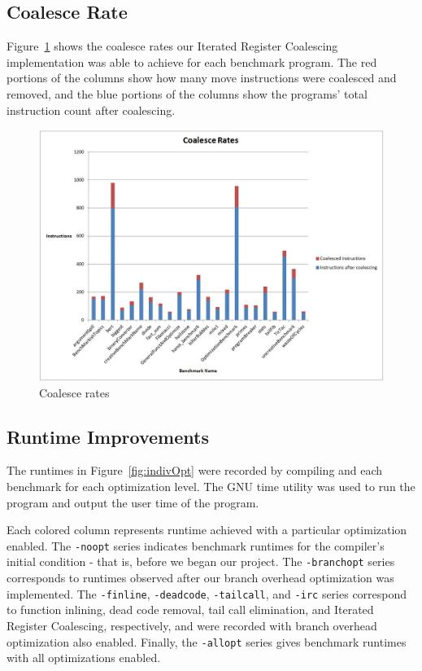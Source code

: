 \documentclass[12pt]{article}
\begin{document}
\subsection{Coalesce Rate}
Figure~\ref{fig:coalesceRates} shows the coalesce rates our Iterated Register Coalescing implementation was able to achieve for each benchmark program.
The red portions of the columns show how many move instructions were coalesced and removed, and the blue portions of the columns show the programs' total instruction count after coalescing.

\begin{figure}[H]
   \centering
      \includegraphics[width=\textwidth]{coalesce_rates.png}
   \caption{Coalesce rates}
   \label{fig:coalesceRates}
\end{figure}

\subsection{Runtime Improvements}
The runtimes in Figure~\ref{fig:indivOpt} were recorded by compiling and each benchmark for each optimization level.
The GNU time utility was used to run the program and output the user time of the program.

Each colored column represents runtime achieved with a particular optimization enabled.
The {\tt -noopt} series indicates benchmark runtimes for the compiler's initial condition - that is, before we began our project.
The {\tt -branchopt} series corresponds to runtimes observed after our branch overhead optimization was implemented.
The {\tt -finline}, {\tt -deadcode}, {\tt -tailcall}, and {\tt -irc} series correspond to function inlining, dead code removal, tail call elimination, and Iterated Register Coalescing, respectively, and were recorded with branch overhead optimization also enabled.
Finally, the {\tt -allopt} series gives benchmark runtimes with all optimizations enabled.
\end{document}
